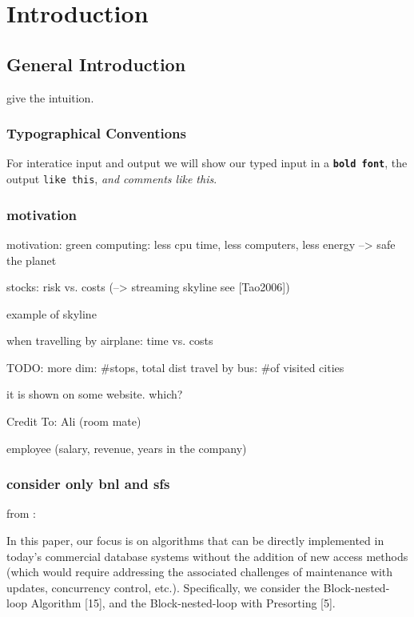 \chapter{Introduction\revision}
\label{chap:Introduction}


\section{General Introduction}

give the intuition.

\subsection{Typographical Conventions}
For interatice input and output we will show our typed input in a \texttt{\bfseries bold font}, the output \texttt{like this}, \textit{and comments like this}.

\subsection{motivation}
motivation: green computing: less cpu time, less computers, less energy --> safe the planet

stocks: risk vs. costs (--> streaming skyline see [Tao2006])

example of skyline

when travelling by airplane: time vs. costs

TODO: more dim: \#stops, total dist
travel by bus: \#of visited cities

it is shown on some website. which?

Credit To: Ali (room mate)

employee (salary, revenue, years in the company)

\subsection{consider only bnl and sfs}

from \citep{Chaudhuri2006}:

In this paper, our focus is on algorithms that can be
directly implemented in today's commercial database systems
without the addition of new access methods (which
would require addressing the associated challenges of maintenance
with updates, concurrency control, etc.). Specifically,
we consider the Block-nested-loop Algorithm [15],
and the Block-nested-loop with Presorting [5].

